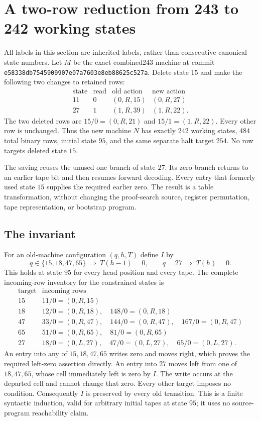 \section{A two-row reduction from 243 to 242 working states}

All labels in this section are inherited labels, rather than consecutive
canonical state numbers.  Let $M$ be the exact combined243 machine at commit
\texttt{e58338db7545909907e07a7603e8eb88625c527a}.  Delete state $15$ and make
the following two changes to retained rows:
\[
\begin{array}{c|c|c|c}
\text{state}&\text{read}&\text{old action}&\text{new action}\\\hline
11&0&(0,R,15)&(0,R,27)\\
27&1&(1,R,39)&(1,R,22).
\end{array}
\]
The two deleted rows are $15/0=(0,R,21)$ and $15/1=(1,R,22)$.
Every other row is unchanged.  Thus the new machine $N$ has exactly $242$
working states, $484$ total binary rows, initial state $95$, and the same
separate halt target $254$.  No row targets deleted state $15$.

The saving reuses the unused one branch of state $27$.  Its zero branch
returns to an earlier tape bit and then resumes forward decoding.  Every
entry that formerly used state $15$ supplies the required earlier zero.
The result is a table transformation, without changing the proof-search
source, register permutation, tape representation, or bootstrap program.

\subsection{The invariant}

For an old-machine configuration $(q,h,T)$ define $I$ by
\[
q\in\{15,18,47,65\}\ \Longrightarrow\ T(h-1)=0,
\qquad
q=27\ \Longrightarrow\ T(h)=0.
\]
This holds at state $95$ for every head position and every tape.  The complete
incoming-row inventory for the constrained states is
\[
\begin{array}{c|l}
\text{target}&\text{incoming rows}\\\hline
15&11/0=(0,R,15)\\
18&12/0=(0,R,18),\quad148/0=(0,R,18)\\
47&33/0=(0,R,47),\quad144/0=(0,R,47),\quad167/0=(0,R,47)\\
65&51/0=(0,R,65),\quad81/0=(0,R,65)\\
27&18/0=(0,L,27),\quad47/0=(0,L,27),\quad65/0=(0,L,27).
\end{array}
\]
An entry into any of $15,18,47,65$ writes zero and moves right, which proves
the required left-zero assertion directly.  An entry into $27$ moves left
from one of $18,47,65$, whose cell immediately left is zero by $I$.  The
write occurs at the departed cell and cannot change that zero.  Every other
target imposes no condition.  Consequently $I$ is preserved by every old
transition.  This is a finite syntactic induction, valid for arbitrary
initial tapes at state $95$; it uses no source-program reachability claim.

